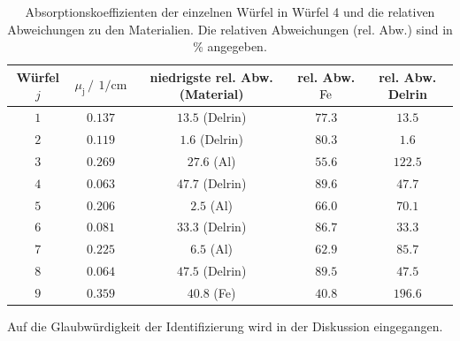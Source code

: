 \FloatBarrier
\begin{table}
    \centering
    \caption{Absorptionskoeffizienten der einzelnen Würfel in Würfel 4 und die relativen Abweichungen zu den Materialien. Die relativen Abweichungen (rel. Abw.) sind in \% angegeben.}
    \label{tab:Würfel4_mu}
    \begin{tabular}{c c c c c}
        \toprule
        Würfel $j$&$\mu_{\text{j}} \,/\,\SI{}{1\per\centi\meter}$&niedrigste rel. Abw. (Material)& rel. Abw. $\ce{Fe}$&rel. Abw. Delrin\\
        \midrule
        $\num{1}$ &$\num{0.137}$&$\num{13.5}$ (Delrin)&$\num{77.3}$&$\num{13.5}$\\
        $\num{2}$ &$\num{0.119}$&$\num{1.6}$ (Delrin)&$\num{80.3}$&$\num{1.6}$\\
        $\num{3}$ &$\num{0.269}$&$\num{27.6}$ (Al)&$\num{55.6}$&$\num{122.5}$\\
        $\num{4}$ &$\num{0.063}$&$\num{47.7}$ (Delrin)&$\num{89.6}$&$\num{47.7}$\\
        $\num{5}$ &$\num{0.206}$&$\num{2.5}$ (Al)&$\num{66.0}$&$\num{70.1}$\\
        $\num{6}$ &$\num{0.081}$&$\num{33.3}$ (Delrin)&$\num{86.7}$&$\num{33.3}$\\
        $\num{7}$ &$\num{0.225}$&$\num{6.5}$ (Al)&$\num{62.9}$&$\num{85.7}$\\
        $\num{8}$ &$\num{0.064}$&$\num{47.5}$ (Delrin)&$\num{89.5}$&$\num{47.5}$\\
        $\num{9}$ &$\num{0.359}$&$\num{40.8}$ (Fe)&$\num{40.8}$&$\num{196.6}$\\
        \bottomrule
    \end{tabular}
\end{table}
\FloatBarrier

Auf die Glaubwürdigkeit der Identifizierung wird in der Diskussion eingegangen.
\newpage